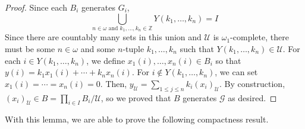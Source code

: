 \documentclass[a4paper]{amsart}
\theoremstyle{definition}
\theoremstyle{remark}
\numberwithin{equation}{section}
\begin{document}
\begin{proof}
    Since each $B_i$ generates $G_i$,
    \[
    \bigcup_{n \in \omega \text{ and } k_1, \dotsc, k_n \in \mathbb{Z}} Y(k_1,\dotsc,k_n) = I
    \]
    Since there are countably many sets in this union and $\mathcal{U}$ is $\omega_1$-complete, there must be some \(n\in\omega\) and some \(n\)-tuple \(k_1,\dotsc,k_n\) such that $Y(k_1,\dotsc,k_n) \in \mathcal{U}$. For each $i\in Y(k_1,\dotsc,k_n)$, we define $x_1(i), \dotsc, x_n(i)\in B_i$ so that $y(i) = k_1 x_1(i) + \dotsb + k_n x_n(i)$. For $i \notin Y(k_1,\dots,k_n)$, we can set $x_1(i) = \cdots = x_n(i) = 0$. Then, $y_{\mathcal{U}} = \sum_{1 \leq j \leq n} k_i (x_i)_{\mathcal{U}}$. By construction, \((x_i)_\mathcal{U} \in B = \prod_{i \in I} B_i / \mathcal{U}\), so we proved that $B$ generates $\mathcal{G}$ as desired.
\end{proof}

With this lemma, we are able to prove the following compactness result.
\end{document}
